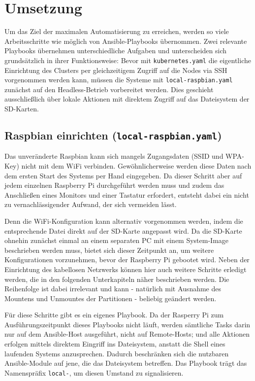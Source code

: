 \chapter{Umsetzung}\label{ch:umsetzung}

Um das Ziel der maximalen Automatisierung zu erreichen, werden so viele Arbeitsschritte wie möglich von Ansible-Playbooks übernommen.
Zwei relevante Playbooks übernehmen unterschiedliche Aufgaben und unterscheiden sich grundsätzlich in ihrer Funktionsweise:
Bevor mit \texttt{kubernetes.yaml} die eigentliche Einrichtung des Clusters per gleichzeitigem Zugriff auf die Nodes via SSH vorgenommen werden kann, müssen die Systeme mit \texttt{local-raspbian.yaml} zunächst auf den Headless-Betrieb vorbereitet werden.
Dies geschieht ausschließlich über lokale Aktionen mit direktem Zugriff auf das Dateisystem der SD-Karten.

\section{Raspbian einrichten (\texttt{local-raspbian.yaml})}\label{sec:raspbian-einrichten}

Das unveränderte Raspbian kann sich mangels Zugangsdaten (SSID und WPA-Key) nicht mit dem WiFi verbinden.
Gewöhnlicherweise werden diese Daten nach dem ersten Start des Systems per Hand eingegeben.
Da dieser Schritt aber auf jedem einzelnen Raspberry Pi durchgeführt werden muss und zudem das Anschließen eines Monitors und einer Tastatur erfordert, entsteht dabei ein nicht zu vernachlässigender Aufwand, der sich vermeiden lässt.

Denn die WiFi-Konfiguration kann alternativ vorgenommen werden, indem die entsprechende Datei direkt auf der SD-Karte angepasst wird.
Da die SD-Karte ohnehin zunächst einmal an einem separaten PC mit einem System-Image beschrieben werden muss, bietet sich dieser Zeitpunkt an, um weitere Konfigurationen vorzunehmen, bevor der Raspberry Pi gebootet wird.
Neben der Einrichtung des kabellosen Netzwerks können hier auch weitere Schritte erledigt werden, die in den folgenden Unterkapiteln näher beschrieben werden.
Die Reihenfolge ist dabei irrelevant und kann - natürlich mit Ausnahme des Mountens und Unmountes der Partitionen - beliebig geändert werden.

Für diese Schritte gibt es ein eigenes Playbook.
Da der Rasperry Pi zum Ausführungszeitpunkt dieses Playbooks nicht läuft, werden sämtliche Tasks darin nur auf dem Ansible-Host ausgeführt, nicht auf Remote-Hosts; und alle Aktionen erfolgen mittels direktem Eingriff ins Dateisystem, anstatt die Shell eines laufenden Systems anzusprechen.
Dadurch beschränken sich die nutzbaren Ansible-Module auf jene, die das Dateisystem betreffen.
Das Playbook trägt das Namenspräfix \texttt{local-}, um diesen Umstand zu signalisieren.

